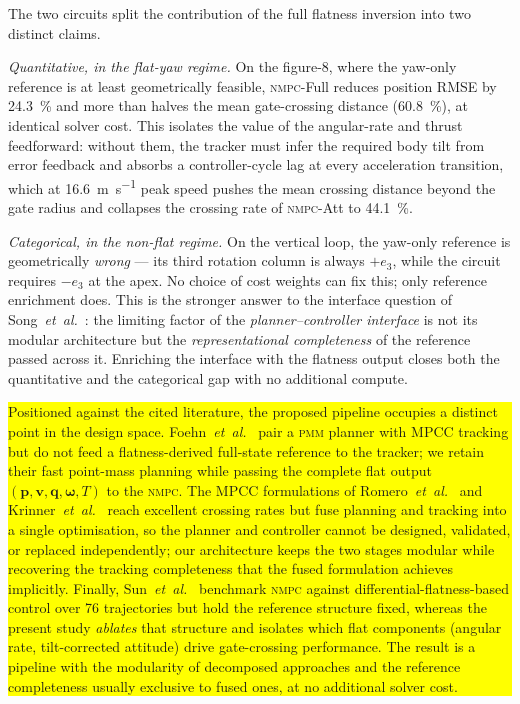 \documentclass{ieeeaccess}
\newcommand{\hlpar}[1]{\par\noindent\colorbox{yellow}{%
  \parbox{\dimexpr\linewidth-2\fboxsep\relax}{#1}}\par}
\newcommand{\vect}[1]{\bm{#1}}
\newcommand{\pmm}{\textsc{pmm}}
\newcommand{\nmpc}{\textsc{nmpc}}
\begin{document}
The two circuits split the contribution of the full flatness
inversion into two distinct claims.

\emph{Quantitative, in the flat-yaw regime.}
On the figure-8, where the yaw-only reference is at least
geometrically feasible, \nmpc{}-Full reduces position RMSE by
\SI{24.3}{\percent} and more than halves the mean gate-crossing
distance (\SI{60.8}{\percent}), at identical solver cost.
This isolates the value of the angular-rate and thrust feedforward:
without them, the tracker must infer the required body tilt from
error feedback and absorbs a controller-cycle lag at every
acceleration transition, which at \SI{16.6}{\metre\per\second} peak
speed pushes the mean crossing distance beyond the gate radius and
collapses the crossing rate of \nmpc{}-Att to \SI{44.1}{\percent}.

\emph{Categorical, in the non-flat regime.}
On the vertical loop, the yaw-only reference is geometrically
\emph{wrong} --- its third rotation column is always $+e_3$, while
the circuit requires $-e_3$ at the apex.
No choice of cost weights can fix this; only reference enrichment
does.
This is the stronger answer to the interface question of
Song~\textit{et~al.}~\cite{song2023reaching}: the limiting factor
of the \emph{planner--controller interface} is not its modular
architecture but the \emph{representational completeness} of the
reference passed across it.
Enriching the interface with the flatness output closes both the
quantitative and the categorical gap with no additional compute.

\hlpar{%
Positioned against the cited literature, the proposed pipeline occupies
a distinct point in the design space.
Foehn~\textit{et~al.}~\cite{foehn2021time} pair a \pmm{} planner with
\mbox{MPCC} tracking but do not feed a flatness-derived full-state
reference to the tracker; we retain their fast point-mass planning while
passing the complete flat output $(\vect{p},\vect{v},\vect{q},
\vect{\omega},T)$ to the \nmpc{}.
The \mbox{MPCC} formulations of
Romero~\textit{et~al.}~\cite{romero2022mpcc} and
Krinner~\textit{et~al.}~\cite{krinner2024mpcc} reach excellent crossing
rates but fuse planning and tracking into a single optimisation, so the
planner and controller cannot be designed, validated, or replaced
independently; our architecture keeps the two stages modular while
recovering the tracking completeness that the fused formulation
achieves implicitly.
Finally, Sun~\textit{et~al.}~\cite{sun2022comparative} benchmark \nmpc{}
against differential-flatness-based control over 76 trajectories but
hold the reference structure fixed, whereas the present study
\emph{ablates} that structure and isolates which flat components
(angular rate, tilt-corrected attitude) drive gate-crossing
performance.
The result is a pipeline with the modularity of decomposed approaches
and the reference completeness usually exclusive to fused ones, at no
additional solver cost.}
\end{document}

